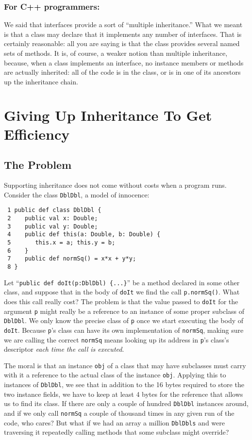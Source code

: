 \subsubsection{ For C++ programmers: } 
We said that interfaces provide a sort of
``multiple inheritance.''  What we meant is that a class may declare that it
implements any number of interfaces.  That is certainly reasonable: all you are
saying is that the class provides several named sets of methods.  It is, of
course, a weaker notion than multiple inheritance, because,  when a class
implements an interface, no instance members or methods are actually inherited:
all of the code is in the class, or is in one of its ancestors up the
inheritance chain.

\section{Giving Up Inheritance To Get Efficiency}\label{sec:guitge}
\subsection{The Problem}

Supporting inheritance does not come without costs when a program runs.
Consider the class {\tt DblDbl}, a model of innocence:
\begin{verbatim}
 1 public def class DblDbl {
 2    public val x: Double;
 3    public val y: Double;
 4    public def this(a: Double, b: Double) {
 5       this.x = a; this.y = b;
 6    }
 7    public def normSq() = x*x + y*y;
 8 }
\end{verbatim} 
Let ``{\tt public def doIt(p:DblDbl) \{...\}}'' be a method declared in some
other class, and suppose that in the body of {\tt doIt}
we find the call {\tt p.normSq()}.  What does this call really cost?
The problem is that the value passed to {\tt doIt} for the argument {\tt p}
might really be a reference to an instance of some proper subclass
of {\tt DblDbl}. We only know the precise class of {\tt p} once we start
executing the body of {\tt doIt}.  Because {\tt p}'s class can have its own
implementation of {\tt normSq}, making sure we are calling the correct
{\tt normSq} means looking up its address in {\tt p}'s class's 
descriptor {\em each time the call is executed}.

The moral is that an instance {\tt obj} of a class that may have subclasses
must carry with it a reference to the actual class of the instance {\tt obj}.
Applying this to instances of {\tt DblDbl}, we see that in addition to
the 16 bytes required to store the two instance fields, we have to keep
at least 4 bytes for the reference that allows us to find its class.
If there are only a couple of hundred {\tt DblDbl} instances around, and
if we only call {\tt normSq} a couple of thousand times in any
given run of the code, who cares?  But what if we had an array a million
{\tt DblDbls} and were traversing it repeatedly calling methods that
some subclass might override?

